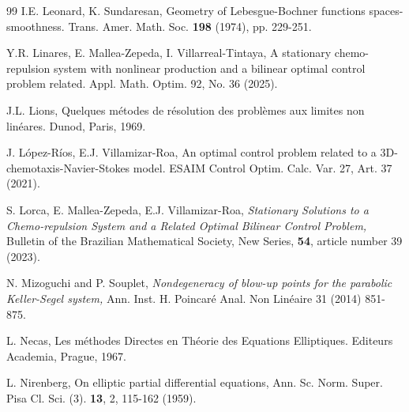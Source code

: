 \documentclass[11pt,reqno]{amsart}%
\numberwithin{equation}{section}
\begin{document}
{\begin{thebibliography}{99}
 I.E. Leonard, K. Sundaresan,
Geometry of Lebesgue-Bochner functions spaces-smoothness.
Trans. Amer. Math. Soc. {\bf 198} (1974), pp. 229-251.

 Y.R. Linares, E. Mallea-Zepeda, I. Villarreal-Tintaya, 
A stationary chemo-repulsion system with nonlinear production and a bilinear optimal control problem related.
Appl. Math. Optim. 92, No. 36 (2025).

 J.L. Lions, Quelques m\'etodes de r\'esolution des probl\`emes aux limites non lin\'eares. Dunod, Paris, 1969.


  J. L\'opez-R\'ios, E.J. Villamizar-Roa, An optimal control problem related to a 3D-chemotaxis-Navier-Stokes model. ESAIM Control Optim. Calc. Var. 
27, Art. 37 (2021). 






	






  {S. Lorca, E. Mallea-Zepeda, E.J. Villamizar-Roa,} \textit{Stationary Solutions to a Chemo-repulsion System and a Related Optimal Bilinear Control Problem,}  Bulletin of the Brazilian Mathematical Society, New Series, \textbf{54}, article number 39 (2023).


 N. Mizoguchi and P. Souplet, \emph{Nondegeneracy of blow-up points for the parabolic
Keller-Segel system,} Ann. Inst. H. Poincar\'e Anal. Non Lin\'eaire 31 (2014) 851-875. 
 

 L. Necas, Les m\'ethodes Directes en Th\'eorie des Equations Elliptiques. 
Editeurs Academia, Prague, 1967.

 L. Nirenberg, On elliptic partial differential equations, Ann. Sc. Norm. Super. Pisa Cl. Sci. (3).
{\bf 13}, 2, 115-162 (1959).


\end{thebibliography}}
\end{document}
